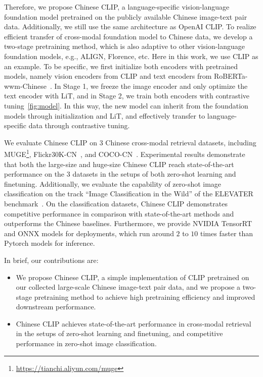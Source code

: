 \documentclass[11pt]{article}
\begin{document}
Therefore, we propose Chinese CLIP, a language-specific vision-language foundation model pretrained on the publicly available Chinese image-text pair data.  
Additionally, we still use the same architecture as OpenAI CLIP.  
To realize efficient transfer of cross-modal foundation model to Chinese data, we develop a two-stage pretraining method, which is also adaptive to other vision-language foundation models, e.g., ALIGN, Florence, etc. 
Here in this work, we use CLIP as an example. 
To be specific, we first initialize both encoders with pretrained models, namely vision encoders from CLIP and text encoders from RoBERTa-wwm-Chinese~\citep{wwm}. In Stage 1, we freeze the image encoder and only optimize the text encoder with LiT, and in Stage 2, we train both encoders with contrastive tuning~\ref{fig:model}. 
In this way, the new model can inherit from the foundation models through initialization and LiT, and effectively transfer to language-specific data through contrastive tuning. 

We evaluate Chinese CLIP on $3$ Chinese cross-modal retrieval datasets, including MUGE\footnote{\url{https://tianchi.aliyun.com/muge}}, Flickr30K-CN~\citep{flickr30k-cn}, and COCO-CN~\citep{coco-cn}. Experimental results demonstrate that both the large-size and huge-size Chinese CLIP reach state-of-the-art performance on the $3$ datasets in the setups of both zero-shot learning and finetuning. 
Additionally, we evaluate the capability of zero-shot image classification on the track ``Image Classification in the Wild'' of the ELEVATER benchmark~\citep{elevater}. 
On the classification datasets, Chinese CLIP demonstrates competitive performance in comparison with state-of-the-art methods and outperforms the Chinese baselines. 
Furthermore, we provide NVIDIA TensorRT and ONNX models for deployments, which run around $2$ to $10$ times faster than Pytorch models for inference. 








In brief, our contributions are:
\begin{itemize}
    \item We propose Chinese CLIP, a simple implementation of CLIP pretrained on our collected large-scale Chinese image-text pair data, and we propose a two-stage pretraining method to achieve high pretraining efficiency and improved downstream performance.
    \item Chinese CLIP achieves state-of-the-art performance in cross-modal retrieval in the setups of zero-shot learning and finetuning, and competitive performance in zero-shot image classification. 
\end{itemize}
 
\end{document}
